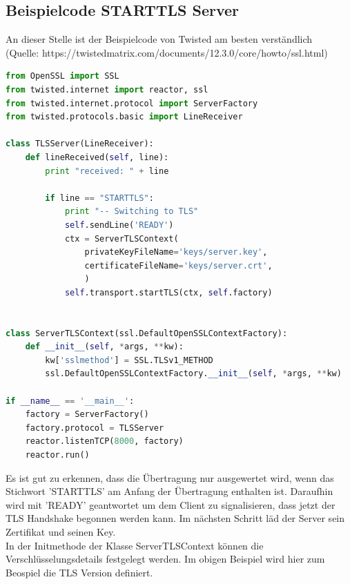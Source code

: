 \subsection{Beispielcode STARTTLS Server}
An dieser Stelle ist der Beispielcode von Twisted am besten verständlich\\
(Quelle: https://twistedmatrix.com/documents/12.3.0/core/howto/ssl.html)\\
\begin{lstlisting}[caption =Testcode Echoserver mit Twisted Framework, language=python, frame=single, breaklines=true,columns=fullflexible, commentstyle=\color{gray}\upshape, captionpos=b]
from OpenSSL import SSL
from twisted.internet import reactor, ssl
from twisted.internet.protocol import ServerFactory
from twisted.protocols.basic import LineReceiver

class TLSServer(LineReceiver):
    def lineReceived(self, line):
        print "received: " + line

        if line == "STARTTLS":
            print "-- Switching to TLS"
            self.sendLine('READY')
            ctx = ServerTLSContext(
                privateKeyFileName='keys/server.key',
                certificateFileName='keys/server.crt',
                )
            self.transport.startTLS(ctx, self.factory)


class ServerTLSContext(ssl.DefaultOpenSSLContextFactory):
    def __init__(self, *args, **kw):
        kw['sslmethod'] = SSL.TLSv1_METHOD
        ssl.DefaultOpenSSLContextFactory.__init__(self, *args, **kw)

if __name__ == '__main__':
    factory = ServerFactory()
    factory.protocol = TLSServer
    reactor.listenTCP(8000, factory)
    reactor.run()
\end{lstlisting}
Es ist gut zu erkennen, dass die Übertragung nur ausgewertet wird, wenn das Stichwort 'STARTTLS' am Anfang der Übertragung enthalten ist. Daraufhin wird mit 'READY' geantwortet um dem Client zu signalisieren, dass jetzt der TLS Handshake begonnen werden kann. Im nächsten Schritt läd der Server sein Zertifikat und seinen Key. \\
In der Initmethode der Klasse ServerTLSContext können die Verschlüsselungsdetails festgelegt werden. Im obigen Beispiel wird hier zum Beospiel die TLS Version definiert.  \\

